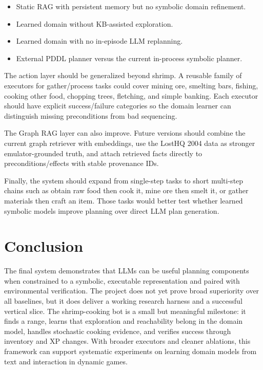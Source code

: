 \documentclass[10pt,twocolumn,letterpaper]{article}
\begin{document}
\begin{itemize}
    \item Static RAG with persistent memory but no symbolic domain refinement.
    \item Learned domain without KB-assisted exploration.
    \item Learned domain with no in-episode LLM replanning.
    \item External PDDL planner versus the current in-process symbolic planner.
\end{itemize}

The action layer should be generalized beyond shrimp. A reusable family of executors for gather/process tasks could cover mining ore, smelting bars, fishing, cooking other food, chopping trees, fletching, and simple banking. Each executor should have explicit success/failure categories so the domain learner can distinguish missing preconditions from bad sequencing.

The Graph RAG layer can also improve. Future versions should combine the current graph retriever with embeddings, use the LostHQ 2004 data as stronger emulator-grounded truth, and attach retrieved facts directly to preconditions/effects with stable provenance IDs.

Finally, the system should expand from single-step tasks to short multi-step chains such as obtain raw food then cook it, mine ore then smelt it, or gather materials then craft an item. Those tasks would better test whether learned symbolic models improve planning over direct LLM plan generation.

\section{Conclusion}

The final system demonstrates that LLMs can be useful planning components when constrained to a symbolic, executable representation and paired with environmental verification. The project does not yet prove broad superiority over all baselines, but it does deliver a working research harness and a successful vertical slice. The shrimp-cooking bot is a small but meaningful milestone: it finds a range, learns that exploration and reachability belong in the domain model, handles stochastic cooking evidence, and verifies success through inventory and XP changes. With broader executors and cleaner ablations, this framework can support systematic experiments on learning domain models from text and interaction in dynamic games.
\end{document}

